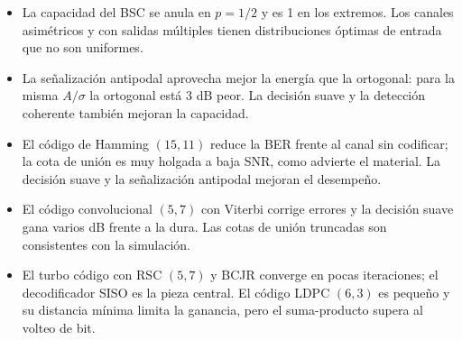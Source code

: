 \documentclass[11pt,a4paper]{article}
\begin{document}
\begin{itemize}
  \item La capacidad del BSC se anula en $p=1/2$ y es 1 en los extremos. Los
  canales asimétricos y con salidas múltiples tienen distribuciones óptimas de
  entrada que no son uniformes.
  \item La señalización antipodal aprovecha mejor la energía que la ortogonal:
  para la misma $A/\sigma$ la ortogonal está 3 dB peor. La decisión suave y la
  detección coherente también mejoran la capacidad.
  \item El código de Hamming $(15,11)$ reduce la BER frente al canal sin
  codificar; la cota de unión es muy holgada a baja SNR, como advierte el
  material. La decisión suave y la señalización antipodal mejoran el
  desempeño.
  \item El código convolucional $(5,7)$ con Viterbi corrige errores y la
  decisión suave gana varios dB frente a la dura. Las cotas de unión truncadas
  son consistentes con la simulación.
  \item El turbo código con RSC $(5,7)$ y BCJR converge en pocas iteraciones;
  el decodificador SISO es la pieza central. El código LDPC $(6,3)$ es pequeño
  y su distancia mínima limita la ganancia, pero el suma-producto supera al
  volteo de bit.
\end{itemize}
\end{document}
